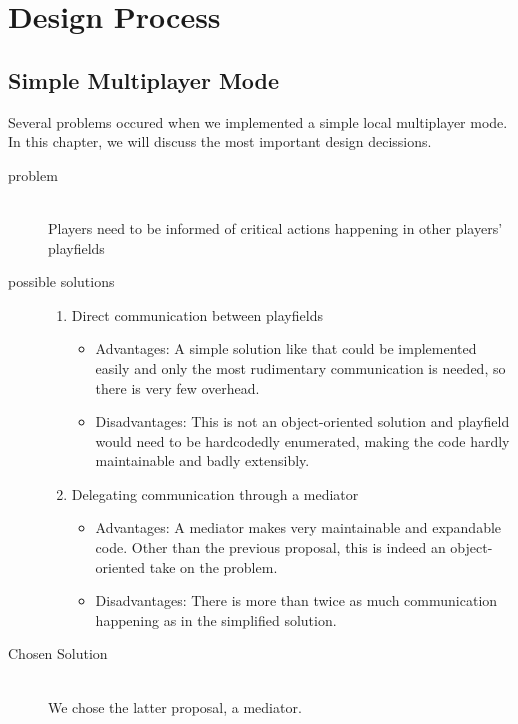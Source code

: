 \section{Design Process}
\subsection{Simple Multiplayer Mode}
%
Several problems occured when we implemented a simple local multiplayer mode. In this chapter, we will discuss the most important design decissions.

\begin{description}
%
  \item[problem] ~\\ \hfill
    Players need to be informed of critical actions happening in other players' playfields 
  \item[possible solutions] \hfill

    \begin{enumerate}
      \item Direct communication between playfields
      \begin{itemize}
        \item Advantages: A simple solution like that could be implemented easily and only the most rudimentary communication is needed, so there is  very few overhead.
        \item Disadvantages: This is not an object-oriented solution and playfield would need to be hardcodedly enumerated, making the code hardly maintainable and badly extensibly. 
      \end{itemize}

      \item Delegating communication through a mediator
      \begin{itemize}
        \item Advantages: A mediator makes very maintainable and expandable code. Other than the previous proposal, this is indeed an object-oriented take on the problem.
        \item Disadvantages: There is more than twice as much communication happening as in the simplified solution.
      \end{itemize}
    \end{enumerate}

  \item[Chosen Solution] ~\\ \hfill
    We chose the latter proposal, a mediator.
  \\


\end{description}
